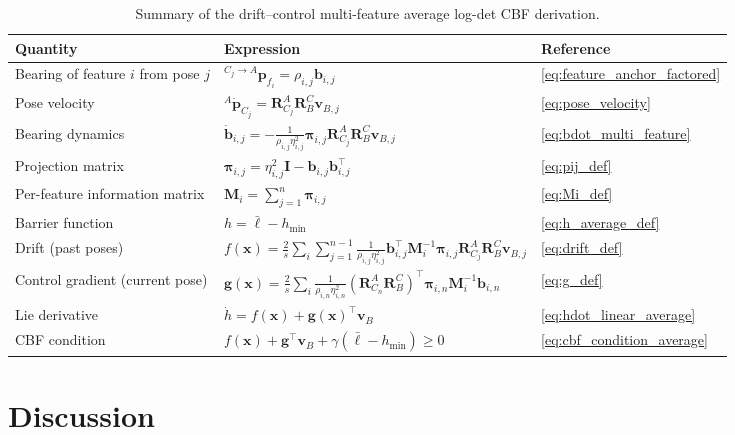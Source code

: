 \documentclass[11pt,a4paper]{article}
\begin{document}
\begin{table}[H]
\centering
\renewcommand{\arraystretch}{1.6}
\begin{tabular}{lll}
\toprule
\textbf{Quantity} & \textbf{Expression} & \textbf{Reference} \\
\midrule
Bearing of feature $i$ from pose $j$
& ${}^{C_j\to A}\bm{p}_{f_i}=\rho_{i,j}\bm{b}_{i,j}$
& \eqref{eq:feature_anchor_factored} \\
Pose velocity
& ${}^{A}\dot{\bm{p}}_{C_j}=\bm{R}_{C_j}^{A}\bm{R}_{B}^{C}\bm{v}_{B,j}$
& \eqref{eq:pose_velocity} \\
Bearing dynamics
& $\dot{\bm{b}}_{i,j}=-\frac{1}{\rho_{i,j}\eta_{i,j}^{2}}\bm{\pi}_{i,j}\bm{R}_{C_j}^{A}\bm{R}_{B}^{C}\bm{v}_{B,j}$
& \eqref{eq:bdot_multi_feature} \\
Projection matrix
& $\bm{\pi}_{i,j}=\eta_{i,j}^{2}\bm{I}-\bm{b}_{i,j}\bm{b}_{i,j}^{\top}$
& \eqref{eq:pij_def} \\
Per-feature information matrix
& $\bm{M}_{i}=\sum_{j=1}^{n}\bm{\pi}_{i,j}$
& \eqref{eq:Mi_def} \\
Barrier function
& $h=\bar{\ell}-h_{\min}$
& \eqref{eq:h_average_def} \\
Drift (past poses)
& $f(\bm{x})=\frac{2}{s}\sum_{i}\sum_{j=1}^{n-1}\frac{1}{\rho_{i,j}\eta_{i,j}^{2}}\bm{b}_{i,j}^{\top}\bm{M}_{i}^{-1}\bm{\pi}_{i,j}\bm{R}_{C_j}^{A}\bm{R}_{B}^{C}\bm{v}_{B,j}$
& \eqref{eq:drift_def} \\
Control gradient (current pose)
& $\bm{g}(\bm{x})=\frac{2}{s}\sum_{i}\frac{1}{\rho_{i,n}\eta_{i,n}^{2}}(\bm{R}_{C_n}^{A}\bm{R}_{B}^{C})^{\top}\bm{\pi}_{i,n}\bm{M}_{i}^{-1}\bm{b}_{i,n}$
& \eqref{eq:g_def} \\
Lie derivative
& $\dot{h}=f(\bm{x})+\bm{g}(\bm{x})^{\top}\bm{v}_{B}$
& \eqref{eq:hdot_linear_average} \\
CBF condition
& $f(\bm{x})+\bm{g}^{\top}\bm{v}_{B}+\gamma(\bar{\ell}-h_{\min})\ge0$
& \eqref{eq:cbf_condition_average} \\
\bottomrule
\end{tabular}
\caption{Summary of the drift--control multi-feature average log-det CBF derivation.}
\label{tab:summary_multi}
\end{table}

\section{Discussion}
\end{document}
